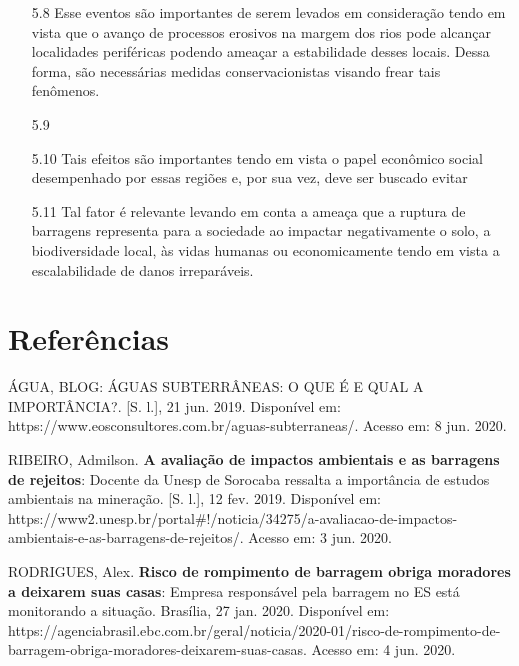 \documentclass[a4paper, 12pt]{article}
\begin{document}
\begin{enumerate}
        \item[5.8] Esse eventos são importantes de serem levados em consideração tendo em vista que o avanço de processos erosivos na margem dos rios pode alcançar localidades periféricas podendo ameaçar a estabilidade desses locais. Dessa forma, são necessárias medidas conservacionistas visando frear tais fenômenos.
        
        \item[5.9] 
        
        \item[5.10] Tais efeitos são importantes tendo em vista o papel econômico social desempenhado por essas regiões e, por sua vez, deve ser buscado evitar 
        
        \item[5.11] Tal fator é relevante levando em conta a ameaça que a ruptura de barragens representa para a sociedade ao impactar negativamente o solo, a biodiversidade local, às vidas humanas ou economicamente tendo em vista a escalabilidade de danos irreparáveis.
    \end{enumerate}

	\section{\textbf{Referências}}

	\noindent ÁGUA, BLOG: ÁGUAS SUBTERRÂNEAS: O QUE É E QUAL A IMPORTÂNCIA?. [S. l.], 21 jun. 2019. Disponível em: https://www.eosconsultores.com.br/aguas-subterraneas/. Acesso em: 8 jun. 2020.
	
	\vspace{.5cm}
	\noindent RIBEIRO, Admilson. \textbf{A avaliação de impactos ambientais e as barragens de rejeitos}: Docente da Unesp de Sorocaba ressalta a importância de estudos ambientais na mineração. [S. l.], 12 fev. 2019. Disponível em: https://www2.unesp.br/portal\#!/noticia/34275/a-avaliacao-de-impactos-ambientais-e-as-barragens-de-rejeitos/. Acesso em: 3 jun. 2020.
	
	\vspace{.5cm}
	\noindent RODRIGUES, Alex. \textbf{Risco de rompimento de barragem obriga moradores a deixarem suas casas}: Empresa responsável pela barragem no ES está monitorando a situação. Brasília, 27 jan. 2020. Disponível em: https://agenciabrasil.ebc\newline.com.br/geral/noticia/2020-01/risco-de-rompimento-de-barragem-obriga-moradores-deixarem-suas-casas. Acesso em: 4 jun. 2020.
\end{document}
